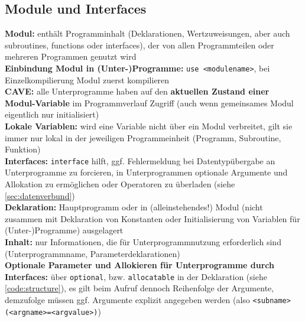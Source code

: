 \documentclass[a4paper, twocolumn]{scrarticle}
\begin{document}
\subsection{Module und Interfaces}
\textbf{Modul:} enthält Programminhalt (Deklarationen, Wertzuweisungen, aber auch subroutines, functions oder interfaces), der von allen Programmteilen oder mehreren Programmen genutzt wird\\
\textbf{Einbindung Modul in (Unter-)Programme:} \lstinline|use <modulename>|, bei Einzelkompilierung Modul zuerst kompilieren\\
\textbf{CAVE:} alle Unterprogramme haben auf den \textbf{aktuellen Zustand einer Modul-Variable} im Programmverlauf Zugriff (auch wenn gemeinsames Modul eigentlich nur initialisiert)\\
\textbf{Lokale Variablen:} wird eine Variable nicht über ein Modul \glqq verbreitet\grqq, gilt sie immer nur lokal in der jeweiligen Programmeinheit (Programm, Subroutine, Funktion)\\
\textbf{Interfaces:} \lstinline|interface| hilft, ggf. Fehlermeldung bei Datentypübergabe an Unterprogramme zu forcieren, in Unterprogrammen optionale Argumente und Allokation zu ermöglichen oder Operatoren zu überladen (siehe \cref{sec:datenverbund})\\
\textbf{Deklaration:} Hauptprogramm oder in (alleinstehendes!) Modul (nicht zusammen mit Deklaration von Konstanten oder Initialisierung von Variablen für (Unter-)Programme) ausgelagert\\
\textbf{Inhalt:} nur Informationen, die für Unterprogrammnutzung erforderlich sind (Unterprogrammname, Parameterdeklarationen)\\
\textbf{Optionale Parameter und Allokieren für Unterprogramme durch Interfaces:} über \lstinline|optional|, bzw. \lstinline|allocatable| in der Deklaration (siehe \cref{code:structure}), es gilt beim Aufruf dennoch Reihenfolge der Argumente, demzufolge müssen ggf. Argumente explizit angegeben werden (also \lstinline|<subname>(<argname>=<argvalue>)|)\\
\end{document}
